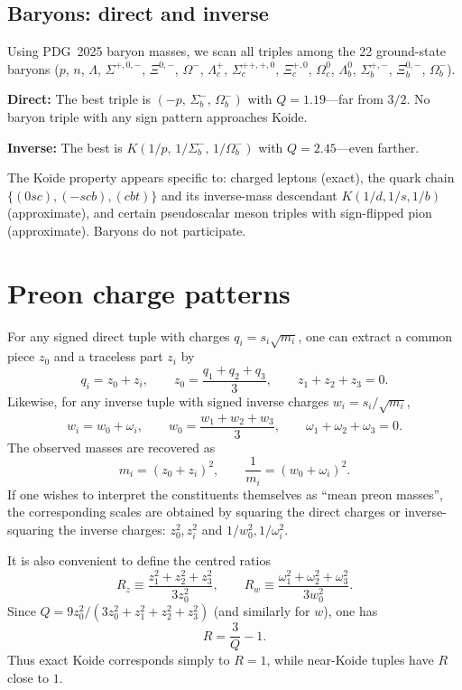 \documentclass[11pt]{article}
\begin{document}
\subsection{Baryons: direct and inverse}

Using PDG~2025 baryon masses, we scan all triples among the
22 ground-state baryons ($p$, $n$, $\Lambda$, $\Sigma^{+,0,-}$,
$\Xi^{0,-}$, $\Omega^-$, $\Lambda_c^+$, $\Sigma_c^{++,+,0}$,
$\Xi_c^{+,0}$, $\Omega_c^0$, $\Lambda_b^0$, $\Sigma_b^{+,-}$,
$\Xi_b^{0,-}$, $\Omega_b^-$).

\medskip\noindent
\textbf{Direct:}  The best triple is
$(-p,\,\Sigma_b^-,\,\Omega_b^-)$ with $Q = 1.19$---far from $3/2$.
No baryon triple with any sign pattern approaches Koide.

\medskip\noindent
\textbf{Inverse:}  The best is
$K(1/p,\,1/\Sigma_b^-,\,1/\Omega_b^-)$ with $Q = 2.45$---even
farther.

\medskip\noindent
The Koide property appears specific to: charged leptons (exact),
the quark chain $\{(0sc),(-scb),(cbt)\}$ and its inverse-mass
descendant $K(1/d,1/s,1/b)$ (approximate), and certain
pseudoscalar meson triples with sign-flipped pion (approximate).
Baryons do not participate.

\section{Preon charge patterns}

For any signed direct tuple with charges
$q_i = s_i\sqrt{m_i}$, one can extract a common piece $z_0$ and a traceless
part $z_i$ by
\[
  q_i = z_0 + z_i,
  \qquad
  z_0 = \frac{q_1+q_2+q_3}{3},
  \qquad
  z_1+z_2+z_3 = 0.
\]
Likewise, for any inverse tuple with signed inverse charges
$w_i = s_i/\sqrt{m_i}$,
\[
  w_i = w_0 + \omega_i,
  \qquad
  w_0 = \frac{w_1+w_2+w_3}{3},
  \qquad
  \omega_1+\omega_2+\omega_3 = 0.
\]
The observed masses are recovered as
\[
  m_i = (z_0 + z_i)^2,
  \qquad
  \frac{1}{m_i} = (w_0 + \omega_i)^2.
\]
If one wishes to interpret the constituents themselves as ``mean preon
masses'', the corresponding scales are obtained by squaring the direct charges
or inverse-squaring the inverse charges:
$z_0^2,z_i^2$ and $1/w_0^2,1/\omega_i^2$.

It is also convenient to define the centred ratios
\[
  R_z \equiv \frac{z_1^2+z_2^2+z_3^2}{3z_0^2},
  \qquad
  R_w \equiv \frac{\omega_1^2+\omega_2^2+\omega_3^2}{3w_0^2}.
\]
Since $Q = 9z_0^2/(3z_0^2+z_1^2+z_2^2+z_3^2)$ (and similarly for $w$),
one has
\[
  R = \frac{3}{Q} - 1.
\]
Thus exact Koide corresponds simply to $R=1$, while near-Koide tuples have
$R$ close to $1$.
\end{document}
